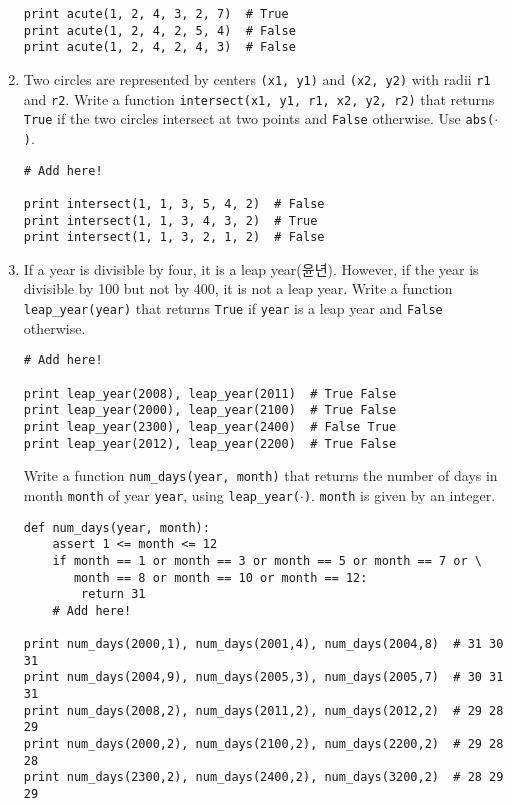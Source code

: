 \documentclass[../main.tex]{subfiles}
\begin{document}
\begin{enumerate}
\begin{verbatim}
print acute(1, 2, 4, 3, 2, 7)  # True
print acute(1, 2, 4, 2, 5, 4)  # False
print acute(1, 2, 4, 2, 4, 3)  # False
\end{verbatim}

\item Two circles are represented by centers \texttt{(x1, y1)} and \texttt{(x2, y2)} with radii \texttt{r1} and \texttt{r2}.
Write a function \texttt{intersect(x1, y1, r1, x2, y2, r2)} that returns \texttt{True} if the two circles intersect at two points and \texttt{False} otherwise.
Use \texttt{abs($\cdot$)}.
\begin{verbatim}
# Add here!

print intersect(1, 1, 3, 5, 4, 2)  # False
print intersect(1, 1, 3, 4, 3, 2)  # True
print intersect(1, 1, 3, 2, 1, 2)  # False
\end{verbatim}

\item If a year is divisible by four, it is a leap year(윤년).
However, if the year is divisible by 100 but not by 400, it is not a leap year.
Write a function \texttt{leap\_year(year)} that returns \texttt{True} if \texttt{year} is a leap year and \texttt{False} otherwise.
\begin{verbatim}
# Add here!

print leap_year(2008), leap_year(2011)  # True False
print leap_year(2000), leap_year(2100)  # True False
print leap_year(2300), leap_year(2400)  # False True
print leap_year(2012), leap_year(2200)  # True False
\end{verbatim}
Write a function \texttt{num\_days(year, month)} that returns the number of days in month \texttt{month} of year \texttt{year}, using \texttt{leap\_year($\cdot$)}.
\texttt{month} is given by an integer.
\begin{verbatim}
def num_days(year, month):
	assert 1 <= month <= 12
	if month == 1 or month == 3 or month == 5 or month == 7 or \
	   month == 8 or month == 10 or month == 12:
		return 31
	# Add here!

print num_days(2000,1), num_days(2001,4), num_days(2004,8)  # 31 30 31
print num_days(2004,9), num_days(2005,3), num_days(2005,7)  # 30 31 31
print num_days(2008,2), num_days(2011,2), num_days(2012,2)  # 29 28 29
print num_days(2000,2), num_days(2100,2), num_days(2200,2)  # 29 28 28
print num_days(2300,2), num_days(2400,2), num_days(3200,2)  # 28 29 29
\end{verbatim}


\end{enumerate}
\end{document}
